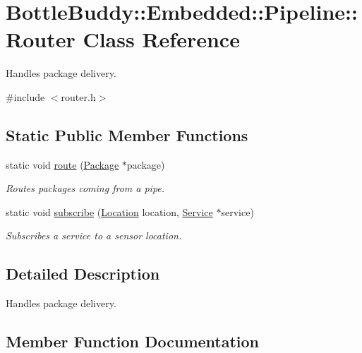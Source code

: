 \hypertarget{class_bottle_buddy_1_1_embedded_1_1_pipeline_1_1_router}{}\section{Bottle\+Buddy\+:\+:Embedded\+:\+:Pipeline\+:\+:Router Class Reference}
\label{class_bottle_buddy_1_1_embedded_1_1_pipeline_1_1_router}


Handles package delivery.  




{\ttfamily \#include $<$router.\+h$>$}

\subsection*{Static Public Member Functions}
\begin{DoxyCompactItemize}
\item 
static void \hyperlink{class_bottle_buddy_1_1_embedded_1_1_pipeline_1_1_router_a9a56d0c05698c1ee0ad398fc87832a6c}{route} (\hyperlink{class_bottle_buddy_1_1_embedded_1_1_pipeline_1_1_package}{Package} $\ast$package)
\begin{DoxyCompactList}\small\item\em Routes packages coming from a pipe. \end{DoxyCompactList}\item 
static void \hyperlink{class_bottle_buddy_1_1_embedded_1_1_pipeline_1_1_router_a49274f0fc1baa9823f645bfabbbb137a}{subscribe} (\hyperlink{package_8h_aea2eca0caf9ed97414998f1a2f404682}{Location} location, \hyperlink{class_bottle_buddy_1_1_embedded_1_1_pipeline_1_1_service}{Service} $\ast$service)
\begin{DoxyCompactList}\small\item\em Subscribes a service to a sensor location. \end{DoxyCompactList}\end{DoxyCompactItemize}


\subsection{Detailed Description}
Handles package delivery. 

\subsection{Member Function Documentation}
